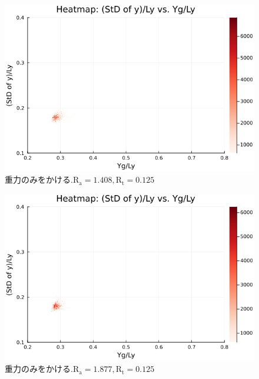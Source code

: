 \begin{figure}[H]
  \centering
  \includegraphics[scale=0.6]{image/dT0_heat/2024-01-15T14:30:47.390_mapg0_chi0_Ay50_rho0.4_T0.43_dT0.0_Rd0.0_Rt0.125_Ra1.4081535_g0.0003999718779659611_run4.0e7.png}
  \caption{$重力のみをかける. \text{R}_\text{a}=1.408,\text{R}_\text{t}=0.125$}
  \label{}
\end{figure}

\begin{figure}[H]
  \centering
  \includegraphics[scale=0.6]{image/dT0_heat/2024-01-15T14:30:47.459_mapg0_chi0_Ay50_rho0.4_T0.43_dT0.0_Rd0.0_Rt0.125_Ra1.877538_g0.0003999718779659611_run4.0e7.png}
  \caption{$重力のみをかける. \text{R}_\text{a}=1.877,\text{R}_\text{t}=0.125$}
  \label{}
\end{figure}

